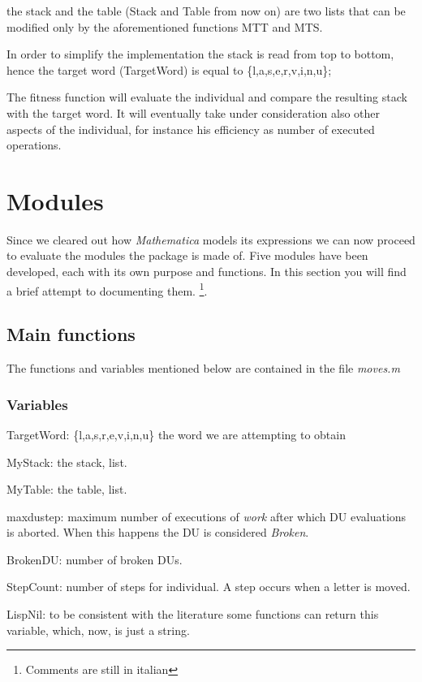 \documentclass[12pt, a4paper]{article}
\begin{document}
the stack and the table (Stack and Table from now on) are two lists that can be modified only by the aforementioned functions MTT and MTS.

In order to simplify the implementation the stack is read from top to bottom, hence the target word (TargetWord) is equal to \{l,a,s,e,r,v,i,n,u\};

The fitness function will evaluate the individual and compare the resulting stack with the target word. It will eventually take under consideration also other aspects of the individual, for instance his efficiency as number of executed operations.


\section{Modules}
Since we cleared out how \textit{Mathematica} models its expressions we can now proceed to evaluate the modules the package is made of.
Five modules have been developed, each with its own purpose and functions. In this section you will find a brief attempt to documenting them.
\footnote{Comments are still in italian}.

\subsection{Main functions}
The functions and variables mentioned below are contained in the file \textit{moves.m}

\subsubsection{Variables}
\label{sec:varmoves}

\begin{description}
	\item{TargetWord:} \{l,a,s,r,e,v,i,n,u\} the word we are attempting to obtain
	\item{MyStack:} the stack, list.
	\item{MyTable:} the table, list.
	\item{maxdustep:} maximum number of executions of {\itshape work} after which DU evaluations is aborted. When this happens the DU is considered \textit{Broken}.
	\item{BrokenDU:} number of broken DUs.
	\item{StepCount:} number of steps for individual. A step occurs when a letter is moved.
	\item{LispNil:} to be consistent with the literature \cite{mitchell} some functions can return this variable, which, now, is just a string.
\end{description}
\end{document}
